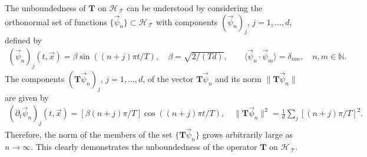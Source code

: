\documentclass[11pt]{amsart}
\newcommand{\Tb}{\mathbf{T}}
\newcommand{\Tc}{\mathcal{T}}
\newcommand{\Hs}{\mathscr{H}}
\begin{document}
The unboundedness of $\Tb$ on $\Hs_{\,\Tc}$ can be understood by
considering the orthonormal set of functions
$\{\vec{\psi}_n\}\subset\Hs_{\,\Tc}$ with components $(\vec{\psi}_n)_j$, $j=1,\ldots,d$,
defined by  
%
\begin{align}\label{eq:Orthonormal}
  (\vec{\psi}_n)_j(t,\vec{x})=\beta\sin((n+j)\pi t/T), \quad
  \beta=\sqrt{2/(Td)},
  \qquad
  \langle\vec{\psi}_n\cdot\vec{\psi}_m\rangle=\delta_{nm}, \quad
  n,m\in\mathbb{N}.
\end{align}
%
The components $(\Tb\vec{\psi}_n)_j$, $j=1,\ldots,d$, of the vector
$\Tb\vec{\psi}_n$ and its norm $\|\Tb\vec{\psi}_n\|$ are given by
%
\begin{align}\label{eq:Orthonormal_Diff}
  (\partial_t\vec{\psi}_n)_j(t,\vec{x})=[\beta(n+j)\pi/T]\cos((n+j)\pi t/T),\quad
  \|\Tb\vec{\psi}_n\|^2%
               =\frac{1}{d}\sum_j[(n+j)\pi/T]^2.
\end{align}
%
Therefore, the norm of the members of the set $\{\Tb\vec{\psi}_n\}$
grows arbitrarily large as $n\to\infty$. This clearly demonstrates the
unboundedness of the operator $\Tb$ on $\Hs_{\,\Tc}$.
\end{document}
